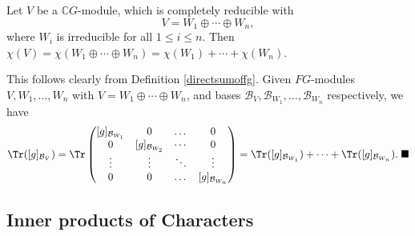 \documentclass[../Project.tex]{subfiles}
\begin{document}
\begin{prop}[\cite{2}]
	Let $V$ be a $\mathbb{C}G$-module, which is completely reducible with
	$$V = W_1 \oplus \cdots \oplus W_n,$$
	where $W_i$ is irreducible for all $1 \leqslant i \leqslant n$.
	Then $\chi(V) = \chi(W_1 \oplus \cdots \oplus W_n) = \chi(W_1) + \cdots + \chi(W_n)$.
\end{prop}

\begin{proo*}
	This follows clearly from Definition \ref{directsumoffg}. Given $FG$-modules $V,W_1,\dots,W_n$ with $V = W_1 \oplus \cdots \oplus W_n$, and bases $\mathcal{B}_V,{\mathcal{B}_{W_1}},\dots,{\mathcal{B}_{W_n}}$ respectively, we have
	$$\Tr([g]_{\mathcal{B}_V}) = \Tr \begin{pmatrix} 
	    [g]_{\mathcal{B}_{W_1}}& 0 & \dots & 0 \\
	    0 & [g]_{\mathcal{B}_{W_2}} & \cdots & 0 \\
	    \vdots & \vdots& \ddots & \vdots\\
	    0 & 0  &\dots & [g]_{\mathcal{B}_{W_n}} \end{pmatrix} = \Tr([g]_{\mathcal{B}_{W_1}}) + \cdots + \Tr([g]_{\mathcal{B}_{W_n}}). \;\blacksquare$$
\end{proo*}


\newpage
\subsection{Inner products of Characters}
\end{document}
